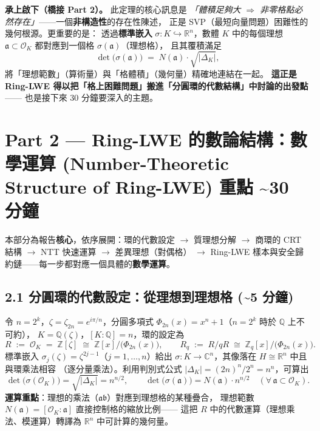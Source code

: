 \documentclass[10.5pt, a4paper]{article}
\theoremstyle{cpt}
\newcommand{\timetag}[1]{\hfill\colorbox{timefill}{\small\color{gray}\textbf{#1}}}
\begin{document}
\textbf{承上啟下（橋接 Part 2）。} 此定理的核心訊息是
\emph{「體積足夠大 $\Longrightarrow$ 非零格點必然存在」}——一個\textbf{非構造性}的存在性陳述，
正是 SVP（最短向量問題）困難性的幾何根源。更重要的是：
透過\textbf{標準嵌入} $\sigma: K \hookrightarrow \mathbb{R}^n$，數體 $K$ 中的每個理想
$\mathfrak{a}\subset\mathcal{O}_K$ 都對應到一個格 $\sigma(\mathfrak{a})$（理想格），
且其覆積滿足
\[
  \det\bigl(\sigma(\mathfrak{a})\bigr) \;=\; N(\mathfrak{a})\cdot\sqrt{|\Delta_K|},
\]
將「理想範數」（算術量）與「格體積」（幾何量）精確地連結在一起。
\textbf{這正是 Ring-LWE 得以把「格上困難問題」搬進「分圓環的代數結構」中討論的出發點}——
也是接下來 30 分鐘要深入的主題。

\section{Part 2 — Ring-LWE 的數論結構：數學運算
  \textnormal{\small\color{gray}(Number-Theoretic Structure of Ring-LWE)}
  \timetag{重點 \textasciitilde 30 分鐘}}

本部分為報告\textbf{核心}，依序展開：環的代數設定 $\to$ 質理想分解
$\to$ 商環的 CRT 結構 $\to$ NTT 快速運算 $\to$ 差異理想（對偶格）
$\to$ Ring-LWE 樣本與安全歸約鏈——每一步都對應一個具體的\textbf{數學運算}。

\subsection{2.1 \;分圓環的代數設定：從理想到理想格 \hfill {\footnotesize\color{gray}(\textasciitilde 5 分鐘)}}

令 $n=2^k$，$\zeta=\zeta_{2n}=e^{i\pi/n}$，分圓多項式
$\Phi_{2n}(x)=x^n+1$（$n=2^k$ 時於 $\mathbb{Q}$ 上不可約），
$K=\mathbb{Q}(\zeta)$，$[K:\mathbb{Q}]=n$，環的設定為
\[
  R \;:=\; \mathcal{O}_K \;=\; \mathbb{Z}[\zeta] \;\cong\; \mathbb{Z}[x]/\bigl(\Phi_{2n}(x)\bigr),
  \qquad
  R_q \;:=\; R/qR \;\cong\; \mathbb{Z}_q[x]/\bigl(\Phi_{2n}(x)\bigr).
\]
標準嵌入 $\sigma_j(\zeta)=\zeta^{2j-1}$（$j=1,\ldots,n$）給出
$\sigma:K\to\mathbb{C}^n$，其像落在 $H\cong\mathbb{R}^n$ 中且與環乘法相容
（逐分量乘法）。利用判別式公式 $|\Delta_K| = (2n)^n/2^n = n^n$，可算出
\[
  \det\bigl(\sigma(\mathcal{O}_K)\bigr) = \sqrt{|\Delta_K|} = n^{n/2},
  \qquad
  \det\bigl(\sigma(\mathfrak{a})\bigr) = N(\mathfrak{a})\cdot n^{n/2}\quad(\forall\,\mathfrak{a}\subset\mathcal{O}_K).
\]
\textbf{運算重點}：理想的乘法（$\mathfrak{a}\mathfrak{b}$）對應到理想格的某種疊合，
理想範數 $N(\mathfrak{a})=[\mathcal{O}_K:\mathfrak{a}]$ 直接控制格的縮放比例——
這把 $R$ 中的代數運算（理想乘法、模運算）轉譯為 $\mathbb{R}^n$ 中可計算的幾何量。
\end{document}
